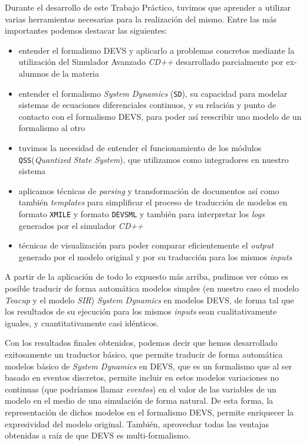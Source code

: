 Durante el desarrollo de este Trabajo Práctico, tuvimos que aprender a utilizar varias herramientas necesarias para la realización del mismo. Entre las más importantes podemos destacar las siguientes:
\begin{itemize}
\item entender el formalismo DEVS y aplicarlo a problemas concretos mediante la utilización del Simulador Avanzado \textit{CD++} desarrollado parcialmente por ex-alumnos de la materia
\item entender el formalismo \textit{System Dynamics} (\texttt{SD}), su capacidad para modelar sistemas de ecuaciones diferenciales continuos, y su relación y punto de contacto con el formalismo DEVS, para poder así reescribir uno modelo de un formalismo al otro
\item tuvimos la necesidad de entender el funcionamiento de los módulos \texttt{QSS}(\textit{Quantized State System}), que utilizamos como integradores en nuestro sistema
\item aplicamos técnicas de \textit{parsing} y transformación de documentos así como también \textit{templates} para simplificar el proceso de traducción de modelos en formato \texttt{XMILE} y formato \texttt{DEVSML} y también para interpretar los \textit{logs} generados por el simulador \textit{CD++}
\item técnicas de visualización para poder comparar eficientemente el \textit{output} generado por el modelo original y por su traducción para los mismos \textit{inputs}
\end{itemize}

A partir de la aplicación de todo lo expuesto más arriba, pudimos ver cómo es posible traducir de forma automática modelos simples (en nuestro caso el modelo \textit{Teacup} y el modelo \textit{SIR}) \textit{System Dynamics} en modelos DEVS, de forma tal que los resultados de su ejecución para los mismos \textit{inputs} sean cualitativamente iguales, y cuantitativamente casi idénticos.

Con los resultados finales obtenidos, podemos decir que hemos desarrollado exitosamente un traductor básico, que permite traducir de forma automática modelos básico de \textit{System Dynamics} en DEVS, que es un formalismo que al ser basado en eventos discretos, permite incluir en estos modelos variaciones no continuas (que podríamos llamar \textit{eventos}) en el valor de las variables de un modelo en el medio de una simulación de forma natural. De esta forma, la representación de dichos modelos en el formalismo DEVS, permite enriquecer la expresividad del modelo original. También, aprovechar todas las ventajas obtenidas a raíz de que DEVS es multi-formalismo.